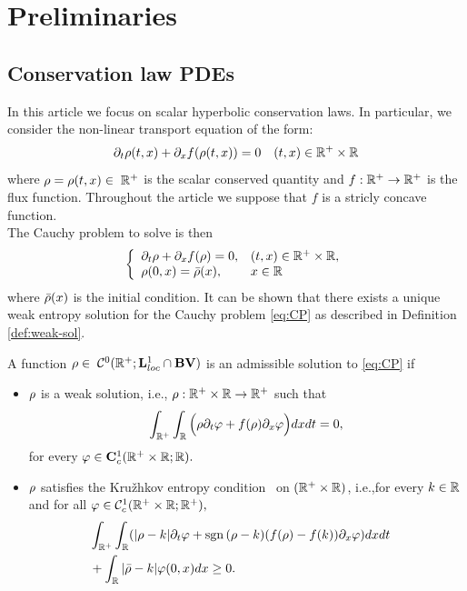 \section{Preliminaries\label{sec:Preliminaries}}


\subsection{Conservation law PDEs\label{sub:Hyperbolic-PDE's}}

In this article we focus on scalar hyperbolic conservation laws. In particular, we consider the non-linear transport equation of the form:
\begin{equation}
	\partial_t\cvar\left(t,x\right)+\partial_x f\left(\cvar\left(t,x\right)\right)=0 \quad (t,x) \in \R^+ \times \R\label{eq:cons}
\end{equation}
where $\rho=\rho(t,x) \in \; \mathbb{R}^+$ is the scalar conserved quantity and $f:\mathbb{R}^+\rightarrow \mathbb{R}^+$ is the flux function. Throughout the article we suppose that $f$ is a stricly concave function. \\
The Cauchy problem to solve is then 
\begin{equation}
	\label{eq:CP}
	\left\{
	\begin{array}{ll}
		\partial_t \cvar+ \partial_x f(\cvar) =0, & (t,x)\in\R^+\times \R, \\
		\cvar(0,x)=\initstate(x),                 & x \in \R               \\
	\end{array}
	\right.
\end{equation}
where $\bar{\rho}(x)$ is the initial condition.
It can be shown that there exists a unique weak entropy solution for the Cauchy problem \eqref{eq:CP} as described in Definition \ref{def:weak-sol}. 
\begin{defn}\label{def:weak-sol}
	A function $\rho \in \; \mathcal{C}^0(\mathbb{R}^+; \mathbf{L}^1_{loc}\cap \mathbf{BV})$ is an admissible solution to \eqref{eq:CP} if
	\begin{itemize}
		\item $\rho$ is a weak solution, i.e., $\rho : \mathbb{R}^+\times\mathbb{R}\rightarrow \mathbb{R}^+$ such that
		\begin{equation}	
			\int_{\mathbb{R}^+}\int_{\mathbb{R}}\Big( \rho \partial_t\varphi +f(\rho)\partial_x\varphi \Big)dxdt=0, 
		\end{equation}
		for every $\varphi \in \mathbf{C}^1_c(\mathbb{R}^+\times \mathbb{R}; \mathbb{R}).$
		\item $\rho$ satisfies the Kru\v{z}hkov entropy condition~\cite{Kruzkov1970} on $(\mathbb{R}^+\times\mathbb{R})$, i.e.,for every $k\in \mathbb{R}$ and for all $\varphi \in \mathcal{C}^1_c(\mathbb{R}^+\times \mathbb{R};\mathbb{R}^+),$
		\begin{eqnarray}
			\label{eq:kruzhkov}
			&\int_{\R^+}\int_{\R}(\modulo{\cvar -k}  \partial_t \varphi + \sgn{(\cvar-k }) (f(\cvar)-f(k))\partial_x\varphi)dxdt& \nonumber\\
			&+\int_{\R}\modulo{\initstate-k}\varphi(0,x)dx\geq 0.&
		\end{eqnarray} 
	\end{itemize}
\end{defn}
